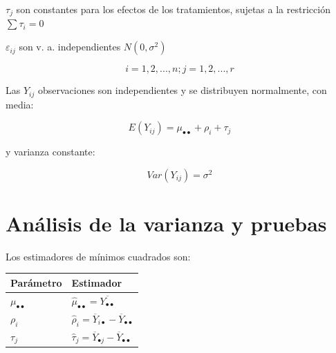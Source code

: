 \documentclass[]{book}
\theoremstyle{definition}
\theoremstyle{definition}
\theoremstyle{definition}
\theoremstyle{remark}
\begin{document}
\(\tau_{j}\) son constantes para los efectos de los tratamientos,
sujetas a la restricción \(\sum\tau_{i} = 0\)

\(\varepsilon_{ij}\) son v. a. independientes \(N(0, \sigma^{2})\)

\[
i = 1,2,...,n;j = 1,2,...,r
\]

Las \(Y_{ij}\) observaciones son independientes y se distribuyen
normalmente, con media:

\[
E\left( Y_{ij} \right) = \mu_{\bullet \bullet} + \rho_{i} + \tau_{j}
\]

y varianza constante:

\[
{Var}\left( Y_{ij} \right) = \sigma^{2}
\]

\hypertarget{analisis-de-la-varianza-y-pruebas}{%
\section{Análisis de la varianza y
pruebas}\label{analisis-de-la-varianza-y-pruebas}}

Los estimadores de mínimos cuadrados son:

\begin{longtable}[]{@{}ll@{}}
\toprule
\begin{minipage}[b]{0.23\columnwidth}\raggedright
Parámetro\strut
\end{minipage} & \begin{minipage}[b]{0.71\columnwidth}\raggedright
Estimador\strut
\end{minipage}\tabularnewline
\midrule
\endhead
\begin{minipage}[t]{0.23\columnwidth}\raggedright
\(\mu_{\bullet \bullet}\)\strut
\end{minipage} & \begin{minipage}[t]{0.71\columnwidth}\raggedright
\({\hat{\mu}}_{\bullet \bullet} = \overline{Y_{\bullet \bullet}}\)\strut
\end{minipage}\tabularnewline
\begin{minipage}[t]{0.23\columnwidth}\raggedright
\(\rho_{i}\)\strut
\end{minipage} & \begin{minipage}[t]{0.71\columnwidth}\raggedright
\({\hat{\rho}}_{i} = {\overline{Y}}_{i \bullet} - {\overline{Y}}_{\bullet \bullet}\)\strut
\end{minipage}\tabularnewline
\begin{minipage}[t]{0.23\columnwidth}\raggedright
\(\tau_{j}\)\strut
\end{minipage} & \begin{minipage}[t]{0.71\columnwidth}\raggedright
\({\hat{\tau}}_{j} = {\overline{Y}}_{\bullet j} - {\overline{Y}}_{\bullet \bullet}\)\strut
\end{minipage}\tabularnewline
\bottomrule
\end{longtable}
\end{document}
